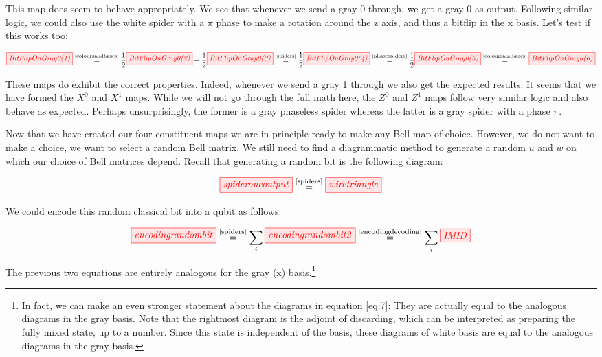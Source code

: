 \documentclass[]{article}
\newcommand{\equaltext}[1]{\ensuremath{\stackrel{\text{#1}}{=}}}
\begin{document}
This map does seem to behave appropriately. We see that whenever we send a gray 0 through, we get a gray 0 as output. Following similar logic, we could also use the white spider with a $\pi$ phase to make a rotation around the z axis, and thus a bitflip in the x basis. Let's test if this works too:

\begin{equation}
\label{equation:bitflip}
\tikzfig{BitFlipOnGray0(1)} \equaltext{\ref{coloursandbases}} \frac{1}{2}\tikzfig{BitFlipOnGray0(2)} + \frac{1}{2}\tikzfig{BitFlipOnGray0(3)} 
\equaltext{\ref{spiders}}
\frac{1}{2}
\tikzfig{BitFlipOnGray0(4)} 
\equaltext{\ref{phasespiders}}
\frac{1}{2}
\tikzfig{BitFlipOnGray0(5)} 
\equaltext{\ref{coloursandbases}}
\tikzfig{BitFlipOnGray0(6)}
\end{equation}

These maps do exhibit the correct properties. Indeed, whenever we send a gray 1 through we also get the expected results. It seems that we have formed the $X^0$ and $X^1$ maps. While we will not go through the full math here, the $Z^0$ and $Z^1$ maps follow very similar logic and also behave as expected. Perhaps unsurprisingly, the former is a gray phaseless spider whereas the latter is a gray spider with a phase $\pi$.


Now that we have created our four constituent maps we are in principle ready to make any Bell map of choice. However, we do not want to make a choice, we want to select a random Bell matrix. We still need to find a diagrammatic method to generate a random $u$ and $w$ on which our choice of Bell matrices depend. Recall that generating a random bit is the following diagram: 

\begin{equation}
	\tikzfig{spideroneoutput} \equaltext{\ref{spiders}} \tikzfig{wiretriangle}
\end{equation}

We could encode this random classical bit into a qubit as follows:

\begin{equation}
	\label{eq:7}
	\tikzfig{encodingrandombit} \equaltext{\ref{spiders}} \sum\limits_{i} \tikzfig{encodingrandombit2} \equaltext{\ref{encodingdecoding}} \sum\limits_{i} \tikzfig{IMID}
\end{equation}

The previous two equations are entirely analogous for the gray (x) basis.\footnote{In fact, we can make an even stronger statement about the diagrams in equation \ref{eq:7}: They are actually equal to the analogous diagrams in the gray basis. Note that the rightmost diagram is the adjoint of discarding, which can be interpreted as preparing the fully mixed state, up to a number. Since this state is independent of the basis, these diagrams of white basis are equal to the analogous diagrams in the gray basis.}
\end{document}
